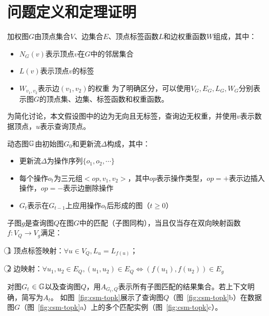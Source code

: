 \section{问题定义和定理证明}
\label{ch3:definition}
\begin{definition}[加权图]
    加权图$G$由顶点集合$V$、边集合$E$、顶点标签函数$L$和边权重函数$W$组成，其中：

    \begin{itemize}
    \item $N_G(v)$表示顶点$v$在$G$中的邻居集合
    \item $L(v)$表示顶点$v$的标签
    \item $W_{v_1, v_2}$表示边$(v_1, v_2)$的权重
    为了明确区分，可以使用$V_G, E_G, L_G, W_G$分别表示图$G$的顶点集、边集、标签函数和权重函数。
    \end{itemize}  
    \end{definition}
    
    为简化讨论，本文假设图中的边为无向且无标签，查询边无权重，并使用$v$表示数据顶点，$u$表示查询顶点。
    
    \begin{definition}[动态图]\label{def:dynamic-graph}
    动态图$\mathbb{G}$由初始图$G_0$和更新流$\Delta$构成，其中：

    \begin{itemize}
    \item 更新流$\Delta$为操作序列$\{o_1, o_2, \cdots\}$
    \item 每个操作$o_t$为三元组$<op, v_1, v_2>$，其中$op$表示操作类型，$op=+$表示边插入操作，$op=-$表示边删除操作
    \item  $G_t$表示在$G_{t-1}$上应用操作$o_t$后形成的图（$t \geq 0$）    
    \end{itemize} 
    \end{definition}
    
    \begin{definition}[子图匹配]\label{def:subgraph-matching}
    子图$g$是查询图$Q$在图$G$中的匹配（子图同构），当且仅当存在双向映射函数$f: V_Q \rightarrow V_g$满足：
    
    \textcircled{1} 顶点标签映射：$\forall u \in V_Q, L_u = L_{f(u)}$；
    
    \textcircled{2} 边映射：$\forall u_1, u_2\in E_Q, (u_1, u_2) \in E_Q \Leftrightarrow (f(u_1), f(u_2)) \in E_g$
    \end{definition}
    
    对图$G_t$ $\in\mathbb{G}$以及查询图$Q$，用$A_{G_t,Q}$表示所有子图匹配的结果集合。若上下文明确，简写为$A_t$。
    如图~\ref{fig:csm-topk}展示了查询图$Q$（图~\ref{fig:csm-topk}b）在数据图$G$（图~\ref{fig:csm-topk}a）上的多个匹配实例（图~\ref{fig:csm-topk}c）。
    
